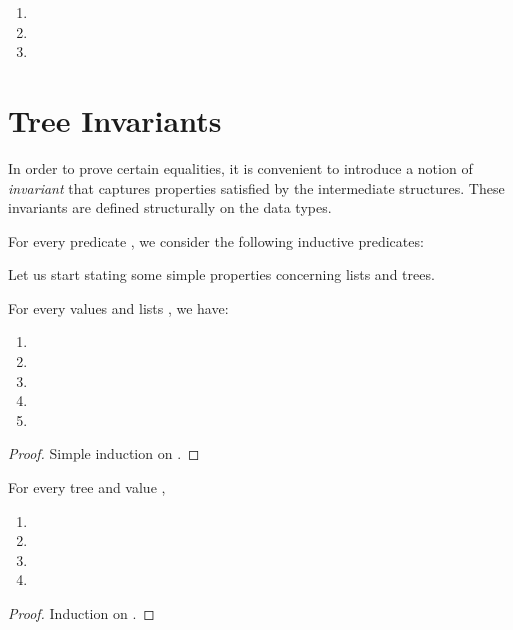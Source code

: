 \documentclass[a4paper,11pt]{llncs}
\begin{document}
\begin{enumerate}
\item 


\item 



\item 

\end{enumerate}


\newpage
\section{Tree Invariants}
\label{app:sec:tree-invs}


In order to prove certain equalities, it is convenient to introduce a
notion of \emph{invariant} that captures properties satisfied by the
intermediate structures. These invariants are defined structurally on
the data types.

\def\AllL{\f{AllL}}
\def\AllT{\f{AllT}}
\def\Prop{\f{Bool}}
For every predicate , we consider the following
inductive predicates:



Let us start stating some simple properties concerning lists and trees.

\begin{lemma}
\label{lemma:app-props}
  For every values  and lists , we have:
  \begin{enumerate}
  \item 
  \item 
  \item 
  \item 
  \item 
  \end{enumerate}
\end{lemma}
\begin{proof}
  Simple induction on .
\end{proof}

\begin{lemma}
\label{lemma:allT-props}
For every tree  and value ,
  \begin{enumerate}
  \item 
  \item 
  \item 
  \item 
  \end{enumerate}
\end{lemma}
\begin{proof}
  Induction on .
\end{proof}
\end{document}
